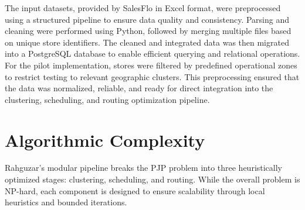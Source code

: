 The input datasets, provided by SalesFlo in Excel format, were preprocessed using a structured pipeline to ensure data quality and consistency. Parsing and cleaning were performed using Python, followed by merging multiple files based on unique store identifiers. The cleaned and integrated data was then migrated into a PostgreSQL database to enable efficient querying and relational operations. For the pilot implementation, stores were filtered by predefined operational zones to restrict testing to relevant geographic clusters. This preprocessing ensured that the data was normalized, reliable, and ready for direct integration into the clustering, scheduling, and routing optimization pipeline.


\section{Algorithmic Complexity}

Rahguzar’s modular pipeline breaks the PJP problem into three heuristically optimized stages: clustering, scheduling, and routing. While the overall problem is NP-hard, each component is designed to ensure scalability through local heuristics and bounded iterations.

